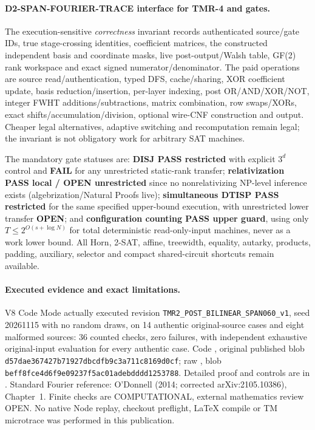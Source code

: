 \documentclass[11pt]{article}
\begin{document}
\paragraph{D2-SPAN-FOURIER-TRACE interface for TMR-4 and gates.}
The execution-sensitive \emph{correctness} invariant records authenticated source/gate IDs, true stage-crossing identities, coefficient matrices, the constructed independent basis and coordinate masks, live post-output/Walsh table, GF(2) rank workspace and exact signed numerator/denominator. The paid operations are source read/authentication, typed DFS, cache/sharing, XOR coefficient update, basis reduction/insertion, per-layer indexing, post OR/AND/XOR/NOT, integer FWHT additions/subtractions, matrix combination, row swaps/XORs, exact shifts/accumulation/division, optional wire-CNF construction and output. Cheaper legal alternatives, adaptive switching and recomputation remain legal; the invariant is not obligatory work for arbitrary SAT machines.

The mandatory gate statuses are: \textbf{DISJ PASS restricted} with explicit $3^d$ control and \textbf{FAIL} for any unrestricted static-rank transfer; \textbf{relativization PASS local / OPEN unrestricted} since no nonrelativizing NP-level inference exists (algebrization/Natural Proofs live); \textbf{simultaneous DTISP PASS restricted} for the same specified upper-bound execution, with unrestricted lower transfer \textbf{OPEN}; and \textbf{configuration counting PASS upper guard}, using only $T\le2^{O(s+\log N)}$ for total deterministic read-only-input machines, never as a work lower bound. All Horn, 2-SAT, affine, treewidth, equality, autarky, products, padding, auxiliary, selector and compact shared-circuit shortcuts remain available.

\paragraph{Executed evidence and exact limitations.}
V8 Code Mode actually executed revision \texttt{TMR2\_POST\_BILINEAR\_SPAN060\_v1}, seed 20261115 with no random draws, on 14 authentic original-source cases and eight malformed sources: 36 counted checks, zero failures, with independent exhaustive original-input evaluation for every authentic case. Code , original published blob \texttt{d57dae367427b71927dbcdfb9c3a711c8169d0cf}; raw , blob \texttt{beff8fce4d6f9e09237f5ac01adebdddd1253788}. Detailed proof and controls are in . Standard Fourier reference: O'Donnell (2014; corrected arXiv:2105.10386), Chapter~1. Finite checks are COMPUTATIONAL, external mathematics review OPEN. No native Node replay, checkout preflight, LaTeX compile or TM microtrace was performed in this publication.
\end{document}

